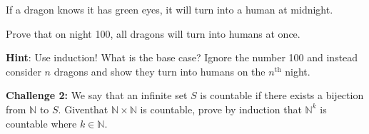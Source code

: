 \documentclass[12pt,letterpaper]{article}
\newcommand\N{\mathbb N}
\newcommand\hint[1]{\textbf{Hint}: #1}
\newif\ifsol
\newcommand{\solm}[1]{\ifsol \textit{(#1)} \fi}
\begin{document}
If a dragon knows it has green eyes, it will turn into a human at midnight. 

Prove that on night 100, all dragons will turn into humans at once. 

\hint{Use induction! What is the base case? Ignore the number 100 and instead consider $n$ dragons and show they turn into humans on the $n^{\text{th}}$ night.}


\solm{If there is only one dragon, it takes her one night to turn into a human. Now assume it takes $k$ nights for $k$ dragons. Consider the case where there is $k+1$ dragons and consider what one individual dragon is thinking. This one dragon sees $k$ dragons with green eyes. Therefore, if this dragon does not have green eyes, she would expect the other dragons to turn into humans after $k$ night since they can see her. Since they don't, this dragon realizes that she also has green and turns into a dragon on night $k+1$.}

\vspace{6cm} 
\textbf{Challenge 2:}
We say that an infinite set $S$ is countable if there exists a bijection from $\N$ to $S$. Giventhat $\N \times \N$ is countable, prove by induction that $\N^k$ is countable where $k \in \N$.

\solm{$\N^k$ is countable so there exists a bijection $f_k$. We can now make a bijection $g_{k+1}$ from $\N^{k+1}$ to $\N \times \N$. $g_{k+1} ((x_1,...,x_{k+1})) = (f_k(x_1,...,x_k),x_{k+1})$.}
  
\end{document}
